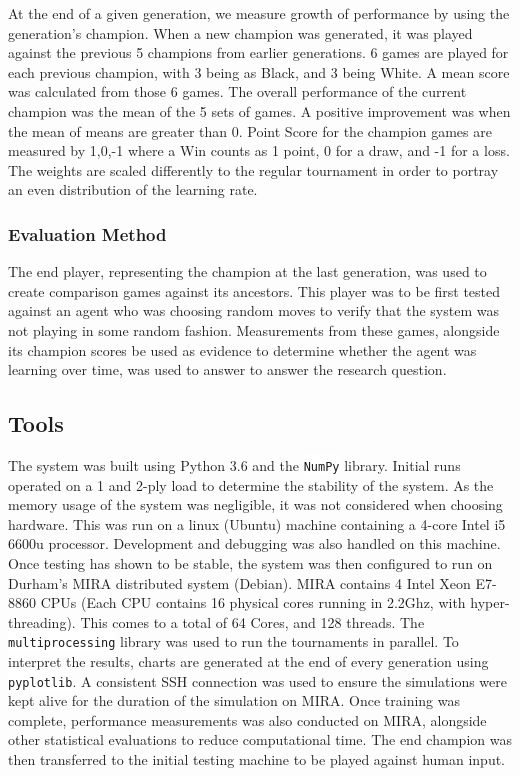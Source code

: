 \documentclass[12pt,a4paper]{article}
\newcommand{\inlinecode}[2]{\colorbox{white}{\fontsize{10}{10}\lstinline[language=#1]$#2$}}
\begin{document}
        At the end of a given generation, we measure growth of performance by using the generation's champion. When a new champion was generated, it was played against the previous 5 champions from earlier generations. 6 games are played for each previous champion, with 3 being as Black, and 3 being White. A mean score was calculated from those 6 games. The overall performance of the current champion was the mean of the 5 sets of games. A positive improvement was when the mean of means are greater than 0. Point Score for the champion games are measured by {1,0,-1} where a Win counts as 1 point, 0 for a draw, and -1 for a loss. The weights are scaled differently to the regular tournament in order to portray an even distribution of the learning rate.
    
        \subsubsection*{Evaluation Method}
    
        The end player, representing the champion at the last generation, was used to create comparison games against its ancestors. This player was to be first tested against an agent who was choosing random moves to verify that the system was not playing in some random fashion. Measurements from these games, alongside its champion scores be used as evidence to determine whether the agent was learning over time, was used to answer to answer the research question.
       
    \subsection{Tools}
        The system was built using Python 3.6 and the \inlinecode{Python}{NumPy} library. Initial runs operated on a 1 and 2-ply load to determine the stability of the system. As the memory usage of the system was negligible, it was not considered when choosing hardware. This was run on a linux (Ubuntu) machine containing a 4-core Intel i5 6600u processor. Development and debugging was also handled on this machine. Once testing has shown to be stable, the system was then configured to run on Durham's MIRA distributed system (Debian). MIRA contains 4 Intel Xeon E7-8860 CPUs (Each CPU contains 16 physical cores running in 2.2Ghz, with hyper-threading). This comes to a total of 64 Cores, and 128 threads. The \inlinecode{Python}{multiprocessing} library was used to run the tournaments in parallel. To interpret the results, charts are generated at the end of every generation using \inlinecode{Python}{pyplotlib}. A consistent SSH connection was used to ensure the simulations were kept alive for the duration of the simulation on MIRA. Once training was complete, performance measurements was also conducted on MIRA, alongside other statistical evaluations to reduce computational time. The end champion was then transferred to the initial testing machine to be played against human input.
\end{document}
